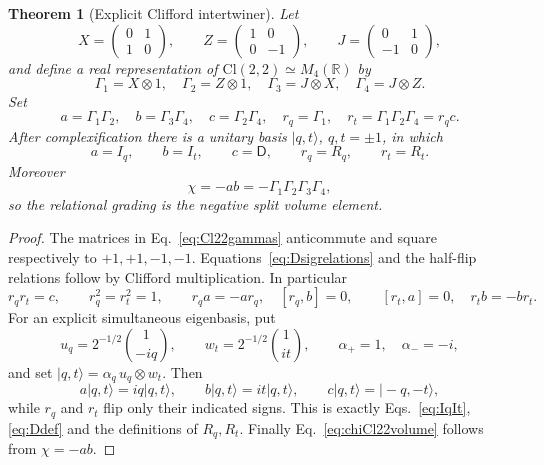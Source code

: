 \documentclass[11pt]{article}
\newtheorem{theorem}{Theorem}[section]
\theoremstyle{definition}\newtheorem{definition}[theorem]{Definition}
\theoremstyle{remark}\newtheorem{remark}[theorem]{Remark}\newtheorem{conjecture}[theorem]{Conjecture}
\begin{document}
\begin{theorem}[Explicit Clifford intertwiner]\label{thm:explicitCl22carrier}
Let
\begin{equation}
 X=\begin{pmatrix}0&1\\1&0\end{pmatrix},\qquad
 Z=\begin{pmatrix}1&0\\0&-1\end{pmatrix},\qquad
 J=\begin{pmatrix}0&1\\-1&0\end{pmatrix},
\end{equation}
and define a real representation of $\mathrm{Cl}(2,2)\simeq M_4(\mathbb R)$ by
\begin{equation}\label{eq:Cl22gammas}
 \Gamma_1=X\otimes1,\quad \Gamma_2=Z\otimes1,
 \quad \Gamma_3=J\otimes X,\quad \Gamma_4=J\otimes Z.
\end{equation}
Set
\begin{equation}\label{eq:Cl22orientationops}
 a=\Gamma_1\Gamma_2,\quad b=\Gamma_3\Gamma_4,
 \quad c=\Gamma_2\Gamma_4,
 \quad r_q=\Gamma_1,
 \quad r_t=\Gamma_1\Gamma_2\Gamma_4=r_qc.
\end{equation}
After complexification there is a unitary basis $|q,t\rangle$, $q,t=\pm1$, in which
\begin{equation}\label{eq:Cl22intertwining}
 a=I_q,\qquad b=I_t,\qquad c=\mathsf D,\qquad
 r_q=R_q,\qquad r_t=R_t.
\end{equation}
Moreover
\begin{equation}\label{eq:chiCl22volume}
 \boxed{\chi=-ab=-\Gamma_1\Gamma_2\Gamma_3\Gamma_4,}
\end{equation}
so the relational grading is the negative split volume element.
\end{theorem}

\begin{proof}
The matrices in Eq.~\eqref{eq:Cl22gammas} anticommute and square respectively to $+1,+1,-1,-1$. Equations~\eqref{eq:Dsigrelations} and the half-flip relations follow by Clifford multiplication. In particular
\begin{equation}
 r_qr_t=c,\qquad r_q^2=r_t^2=1,\qquad
 r_q a=-a r_q,\quad [r_q,b]=0,\qquad
 [r_t,a]=0,\quad r_tb=-br_t.
\end{equation}
For an explicit simultaneous eigenbasis, put
\begin{equation}
 u_q=2^{-1/2}\binom{1}{-iq},\qquad
 w_t=2^{-1/2}\binom{1}{it},\qquad
 \alpha_+=1,\quad\alpha_-=-i,
\end{equation}
and set $|q,t\rangle=\alpha_q\,u_q\otimes w_t$. Then
\begin{equation}
 a|q,t\rangle=iq|q,t\rangle,\qquad
 b|q,t\rangle=it|q,t\rangle,\qquad
 c|q,t\rangle=|-q,-t\rangle,
\end{equation}
while $r_q$ and $r_t$ flip only their indicated signs. This is exactly Eqs.~\eqref{eq:IqIt}, \eqref{eq:Ddef} and the definitions of $R_q,R_t$. Finally Eq.~\eqref{eq:chiCl22volume} follows from $\chi=-ab$.
\end{proof}
\end{document}

